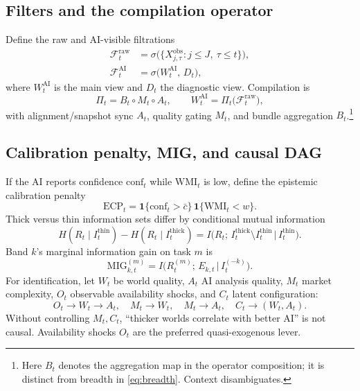 \documentclass[12pt]{article}
\begin{document}
\subsection{Filters and the compilation operator}
Define the raw and AI-visible filtrations
\begin{align}
\mathcal{F}^{\mathrm{raw}}_t&=\sigma\bigl(\{X^{\mathrm{obs}}_{j,\tau}: j\le J,\ \tau\le t\}\bigr),
\label{eq:fraw}\\
\mathcal{F}^{\mathrm{AI}}_t&=\sigma\bigl(W^{\mathrm{AI}}_t,\,D_t\bigr),
\label{eq:fai}
\end{align}
where $W^{\mathrm{AI}}_t$ is the main view and $D_t$ the diagnostic view. Compilation is
\begin{equation}
\Pi_t=B_t\circ M_t\circ A_t,\qquad
W^{\mathrm{AI}}_t=\Pi_t\bigl(\mathcal{F}^{\mathrm{raw}}_t\bigr),
\label{eq:pi}
\end{equation}
with alignment/snapshot sync $A_t$, quality gating $M_t$, and bundle aggregation $B_t$.\footnote{Here $B_t$ denotes the aggregation map in the operator composition; it is distinct from breadth in \eqref{eq:breadth}. Context disambiguates.}

\subsection{Calibration penalty, MIG, and causal DAG}
If the AI reports confidence $\mathrm{conf}_t$ while $\mathrm{WMI}_t$ is low, define the epistemic calibration penalty
\begin{equation}
\mathrm{ECP}_t=\mathbf{1}\{\mathrm{conf}_t>\bar c\}\,\mathbf{1}\{\mathrm{WMI}_t<w\}.
\label{eq:ecp}
\end{equation}
Thick versus thin information sets differ by conditional mutual information
\begin{equation}
H(R_t\mid I^{\mathrm{thin}}_t)-H(R_t\mid I^{\mathrm{thick}}_t)
=I\!\bigl(R_t;\,I^{\mathrm{thick}}_t\setminus I^{\mathrm{thin}}_t\,\big|\,I^{\mathrm{thin}}_t\bigr).
\label{eq:thickthin}
\end{equation}
Band $k$'s marginal information gain on task $m$ is
\begin{equation}
\mathrm{MIG}^{(m)}_{k,t}=I\!\bigl(R^{(m)}_t;\,E_{k,t}\,\big|\,I^{(-k)}_t\bigr).
\label{eq:mig}
\end{equation}
For identification, let $W_t$ be world quality, $A_t$ AI analysis quality, $M_t$ market complexity, $O_t$ observable availability shocks, and $C_t$ latent configuration:
\begin{equation}
O_t\to W_t\to A_t,\quad
M_t\to W_t,\quad
M_t\to A_t,\quad
C_t\to (W_t,A_t).
\label{eq:dag}
\end{equation}
Without controlling $M_t,C_t$, ``thicker worlds correlate with better AI'' is not causal. Availability shocks $O_t$ are the preferred quasi-exogenous lever.
\end{document}
